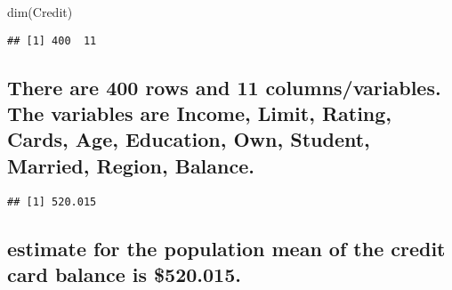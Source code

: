 \documentclass[
]{article}
\newenvironment{Shaded}{\begin{snugshade}}{\end{snugshade}}
\newcommand{\CommentTok}[1]{\textcolor[rgb]{0.56,0.35,0.01}{\textit{#1}}}
\newcommand{\FunctionTok}[1]{\textcolor[rgb]{0.00,0.00,0.00}{#1}}
\newcommand{\NormalTok}[1]{#1}
\newcommand{\OtherTok}[1]{\textcolor[rgb]{0.56,0.35,0.01}{#1}}
\newcommand{\SpecialCharTok}[1]{\textcolor[rgb]{0.00,0.00,0.00}{#1}}
\begin{document}
\begin{Shaded}
\begin{Highlighting}[]
\FunctionTok{dim}\NormalTok{(Credit)}
\end{Highlighting}
\end{Shaded}

\begin{verbatim}
## [1] 400  11
\end{verbatim}

\hypertarget{there-are-400-rows-and-11-columnsvariables.-the-variables-are-income-limit-rating-cards-age-education-own-student-married-region-balance.}{%
\subsection{There are 400 rows and 11 columns/variables. The variables
are Income, Limit, Rating, Cards, Age, Education, Own, Student, Married,
Region,
Balance.}\label{there-are-400-rows-and-11-columnsvariables.-the-variables-are-income-limit-rating-cards-age-education-own-student-married-region-balance.}}

\begin{Shaded}
\end{Shaded}

\begin{verbatim}
## [1] 520.015
\end{verbatim}

\hypertarget{estimate-for-the-population-mean-of-the-credit-card-balance-is-520.015.}{%
\subsection{estimate for the population mean of the credit card balance
is
\$520.015.}\label{estimate-for-the-population-mean-of-the-credit-card-balance-is-520.015.}}

\begin{Shaded}
\end{Shaded}
\end{document}
